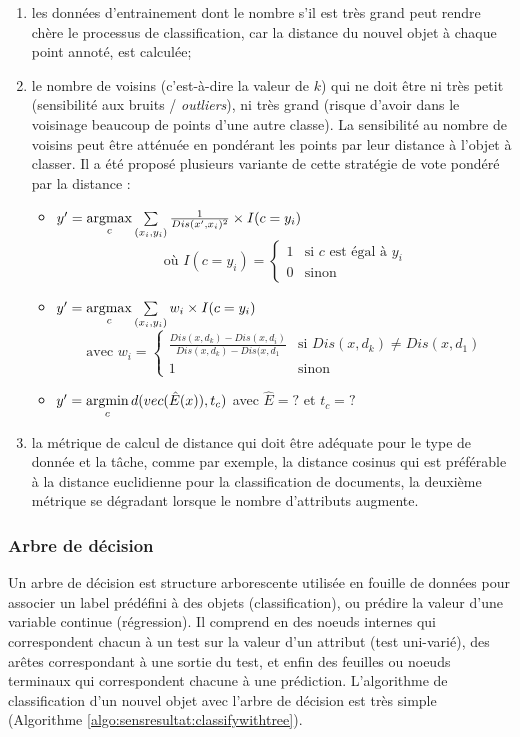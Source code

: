 \begin{enumerate}
	\item les données d'entrainement dont le nombre s'il est très grand peut rendre chère le processus de classification, car la distance du nouvel objet à chaque point annoté, est calculée;
	\item le nombre de voisins (c'est-à-dire la valeur de $k$) qui ne doit être ni très petit (sensibilité aux bruits / \textit{outliers}), ni très grand (risque d'avoir dans le voisinage beaucoup de points d'une autre classe). La sensibilité au nombre de voisins peut être atténuée en pondérant les points par leur distance à l'objet à classer. Il a été proposé plusieurs variante de cette stratégie de \og vote pondéré par la distance \fg{}:
	\begin{itemize}
		\item $y' = \mathop{\mathrm{argmax}}\limits\limits_c \sum\limits_{(x_i,y_i)} \frac{1}{Dis(x', x_i)^2} \times I(c = y_i)$  \citep{dudani1976originalwknn} \[\text{ où } I(c=y_i) = \left\lbrace \begin{array}{ll}
		1 & \text{si }c \text{ est égal à } y_i \\
		0 & \text{sinon}
		\end{array} \right.\]
		\item $y' = \mathop{\mathrm{argmax}}\limits\limits_c \sum\limits_{(x_i,y_i)} w_i \times I(c = y_i)$ \citep{gou2011wknn} \[\text{ avec } w_i = \left\lbrace \begin{array}{ll}
		\frac{Dis(x, d_k) - Dis(x, d_i)}{Dis(x, d_k) - Dis(x, d_1} & \text{si } Dis(x, d_k) \neq Dis(x, d_1) \\
		1 & \text{sinon}
		\end{array} \right.\]
		\item $y' = \mathop{\mathrm{argmin}}\limits\limits_c d(vec(\hat{E}(x)),t_c)$ \citep{bicego2016wknnrevisited} avec $\hat{E} = ?$ et $t_c = ?$
	\end{itemize}
	 
	\item la métrique de calcul de distance qui doit être adéquate pour le type de donnée et la tâche, comme par exemple, la distance cosinus qui est préférable à la distance euclidienne pour la classification de documents, la deuxième métrique se dégradant lorsque le nombre d'attributs augmente.
\end{enumerate}


\subsubsection{Arbre de décision}
Un arbre de décision est structure arborescente utilisée en fouille de données pour associer un label prédéfini à des objets (classification), ou prédire la valeur d'une variable continue (régression). Il comprend en des noeuds internes qui correspondent chacun à un test sur la valeur d'un attribut (test uni-varié), des arêtes correspondant à une sortie du test, et enfin des feuilles ou noeuds terminaux qui correspondent chacune à une prédiction. L'algorithme de classification d'un nouvel objet avec l'arbre de décision est très simple (Algorithme \ref{algo:sensresultat:classifywithtree}).

